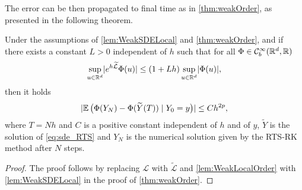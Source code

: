 \documentclass[10pt]{article}
\begin{document}
The error can be then propagated to final time as in \cref{thm:weakOrder}, as presented in the following theorem. 
\begin{theorem} Under the assumptions of \cref{lem:WeakSDELocal} and \cref{thm:weakOrder}, and if there exists a constant $L > 0$ independent of $h$ such that for all $\Phi \in \mathcal C^\infty_b(\mathbb{R}^d, \mathbb{R})$ 
	\begin{equation}
		\sup_{u\in\mathbb{R}^d} \lvert e^{h\widetilde {\mathcal{L}}}\Phi(u)\rvert \leq (1 + Lh)\sup_{u\in\mathbb{R}^d}\lvert\Phi(u)\rvert,
	\end{equation}
	then it holds
	\begin{equation}
		\lvert\operatorname{\mathbb{E}}\big(\Phi(Y_N)- \Phi(\widetilde Y(T))\mid Y_0 = y\big)\rvert \leq Ch^{2p},
	\end{equation}
	where $T = Nh$ and $C$ is a positive constant independent of $h$ and of $y$, $\tilde Y$ is the solution of \eqref{eq:sde_RTS} and $Y_N$ is the numerical solution given by the RTS-RK method after $N$ steps.
\end{theorem} 
\begin{proof} {The proof follows by replacing $\mathcal{L}$ with $\tilde{\mathcal{L}}$ and \cref{lem:WeakLocalOrder} with \cref{lem:WeakSDELocal} in the proof of \cref{thm:weakOrder}.}
\end{proof}
\end{document}
